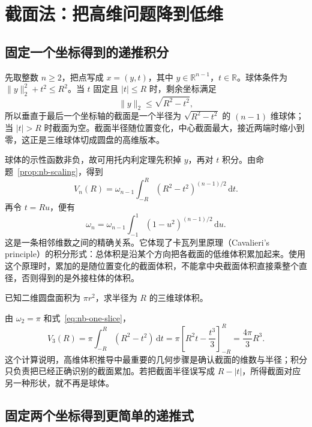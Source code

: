 \documentclass[UTF8]{ctexart}
\begin{document}
\section{截面法：把高维问题降到低维}
\label{sec:nb-slicing}

\subsection{固定一个坐标得到的递推积分}

先取整数 $n\geq2$，把点写成 $x=(y,t)$，其中 $y\in\mathbb R^{n-1}$，$t\in\mathbb R$。球体条件为 $\|y\|_2^2+t^2\leq R^2$。当 $t$ 固定且 $|t|\leq R$ 时，剩余坐标满足
\[
  \|y\|_2\leq\sqrt{R^2-t^2},
\]
所以垂直于最后一个坐标轴的截面是一个半径为 $\sqrt{R^2-t^2}$ 的 $(n-1)$ 维球体；当 $|t|>R$ 时截面为空。截面半径随位置变化，中心截面最大，接近两端时缩小到零，这正是三维球体切成圆盘的高维版本。

球体的示性函数非负，故可用托内利定理先积掉 $y$，再对 $t$ 积分。由命题~\ref{prop:nb-scaling}，得到
\begin{equation}\label{eq:nb-one-slice}
  V_n(R)=\omega_{n-1}\int_{-R}^{R}(R^2-t^2)^{(n-1)/2}\,\mathrm dt.
\end{equation}
再令 $t=Ru$，便有
\begin{equation}\label{eq:nb-adjacent}
  \omega_n=\omega_{n-1}\int_{-1}^{1}(1-u^2)^{(n-1)/2}\,\mathrm du.
\end{equation}
这是一条相邻维数之间的精确关系。它体现了卡瓦列里原理（Cavalieri's principle）的积分形式：总体积是沿某个方向把各截面的低维体积累加起来。使用这个原理时，累加的是随位置变化的截面体积，不能拿中央截面体积直接乘整个直径，否则得到的是外接柱体的体积。

\begin{example}[由圆盘截面求三维球体积]
已知二维圆盘面积为 $\pi r^2$，求半径为 $R$ 的三维球体积。
\end{example}
\begin{solve}
由 $\omega_2=\pi$ 和式~\eqref{eq:nb-one-slice}，
\[
  V_3(R)=\pi\int_{-R}^{R}(R^2-t^2)\,\mathrm dt
  =\pi\left[R^2t-\frac{t^3}{3}\right]_{-R}^{R}
  =\frac{4\pi}{3}R^3.
\]
这个计算说明，高维体积推导中最重要的几何步骤是确认截面的维数与半径；积分只负责把已经正确识别的截面累加。若把截面半径误写成 $R-|t|$，所得截面对应另一种形状，就不再是球体。
\end{solve}

\subsection{固定两个坐标得到更简单的递推式}
\end{document}

